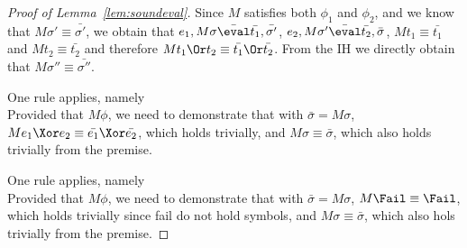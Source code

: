 \begin{proof}[Proof of Lemma~\ref{lem:soundeval}]
{  Since $M$ satisfies both $\phi_1$ and $\phi_2$, and we know that $M\sigma'\equiv \bar{\sigma'}$,
  we obtain that $e_1,M\sigma \bar{\eval}\bar{t_1},\bar{\sigma'}$,
  $e_2,M\sigma'\bar{\eval}\bar{t_2},\bar{\sigma}$, $M t_1\equiv \bar{t_1}$ and $M t_2 \equiv \bar{t_2}$ and therefore $M t_1\Or t_2 \equiv \bar{t_1}\Or\bar{t_2}$.
  From the IH we directly obtain that $M \sigma'' \equiv\bar{\sigma''}$.

  }

  {  One rule applies, namely \\
    Provided that $M\phi$, we need to demonstrate that  with $\bar{\sigma}=M\sigma$,
    $M e_1\Xor e_2 \equiv \bar{e_1}\Xor\bar{e_2}$,
    which holds trivially,
    and $M\sigma\equiv\bar{\sigma}$, which also holds trivially from the premise.

  }

  {  One rule applies, namely \\
    Provided that $M\phi$, we need to demonstrate that  with $\bar{\sigma}=M\sigma$,
    $M \Fail \equiv \Fail$, which holds trivially since fail do not hold symbols,
    and $M\sigma\equiv\bar{\sigma}$, which also hols trivially from the premise.

  }
\end{proof}



